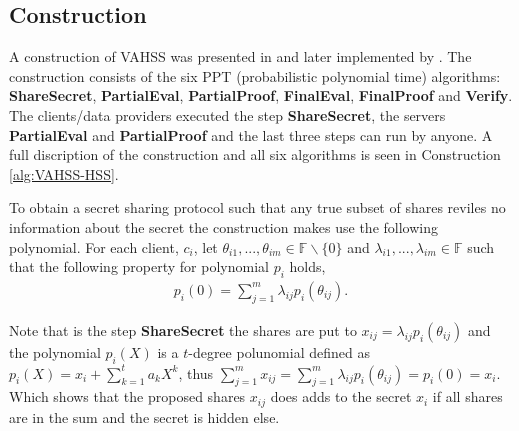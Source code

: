 \subsection*{Construction}
A construction of VAHSS was presented in \cite{SumItUp} and later implemented by \cite{VAHSS}. The construction consists of the six PPT (probabilistic polynomial time) algorithms: \textbf{ShareSecret}, \textbf{PartialEval}, \textbf{PartialProof}, \textbf{FinalEval}, \textbf{FinalProof} and \textbf{Verify}. The clients/data providers executed the step \textbf{ShareSecret}, the servers \textbf{PartialEval} and \textbf{PartialProof} and the last three steps can run by anyone. A full discription of the construction and all six algorithms is seen in Construction \ref{alg:VAHSS-HSS}.

To obtain a secret sharing protocol such that any true subset of shares reviles no information about the secret the construction makes use the following polynomial. For each client, $c_i$, let $\theta_{i1},...,\theta_{im}\in\mathds{F}\backslash\{0\}$ and $\lambda_{i1},...,\lambda_{im}\in\mathds{F}$ such that the following property for polynomial $p_i$ holds,
\begin{align}
\label{eq:pi(0)}
p_i(0) = \sum_{j=1}^m \lambda_{ij}p_i(\theta_{ij}).
\end{align}

Note that is the step \textbf{ShareSecret} the shares are put to $x_{ij}= \lambda_{ij}p_i(\theta_{ij})$ and the polynomial $p_i(X)$ is a $t$-degree polunomial defined as $p_i(X) = x_i + \sum_{k=1}^t a_kX^k$, thus $\sum_{j=1}^m x_{ij} = \sum_{j=1}^m \lambda_{ij}p_i(\theta_{ij})= p_i(0) = x_i$. Which shows that the proposed shares $x_{ij}$ does adds to the secret $x_i$ if all shares are in the sum and the secret is hidden else. 




